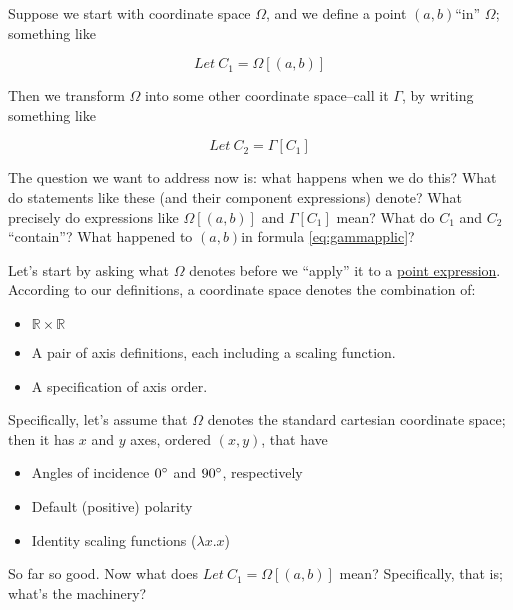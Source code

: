 \documentclass[12pt]{tufte-handout}
\numberwithin{equation}{subsection}
\numberwithin{equation}{subsection}
\newcommand\cspace{coordinate space}
\newcommand\Omg{\(\Omega\)}
\newcommand\sccs{standard cartesian coordinate space}
\newcommand\ab{\((a,b)\)}
\newcommand\xy{\((x,y)\)}
\begin{document}
  Suppose we start with \cspace{} \Omg{}, and we define a point \ab ``in''
  \Omg{}; something like

  \begin{equation}
    \label{eq:omgapplic}
    Let\ C_1 = \Omega[(a,b)]
  \end{equation}

  Then we transform \Omg{} into some other \cspace{}--call it \(\Gamma\),
  by writing something like

  \begin{equation}
    \label{eq:gammapplic}
    Let\ C_2 = \Gamma[C_1]
  \end{equation}

  The question we want to address now is: what happens when we do this?
  What do statements like these (and their component expressions)
  denote?  What precisely do expressions like \(\Omega[(a,b)]\) and
  \(\Gamma[C_1]\) mean? What do \(C_1\) and \(C_2\) ``contain''?  What
  happened to \ab in formula \ref{eq:gammapplic}?

  Let's start by asking what \Omg{} denotes before we ``apply'' it to a
  \hyperref[subs:pointexprs]{point expression}.  According to our definitions, a \cspace{} denotes
  the combination of:

  \begin{itemize}
  \item \(\mathds{R}\times\mathds{R}\)
  \item A pair of axis definitions, each including a scaling function.
  \item A specification of axis order.
  \end{itemize}

  Specifically, let's assume that \Omg{} denotes the \sccs{}; then it
  has \(x\) and \(y\) axes, ordered \xy{}, that have

  \begin{itemize}
  \item Angles of incidence \(0\degree\) and \(90\degree\), respectively
  \item Default (positive) polarity
  \item Identity scaling functions (\(\lambda x.x\))
  \end{itemize}

  So far so good.  Now what does \(Let\ C_1=\Omega[(a,b)]\)
  mean?  Specifically, that is; what's the machinery?
\end{document}
